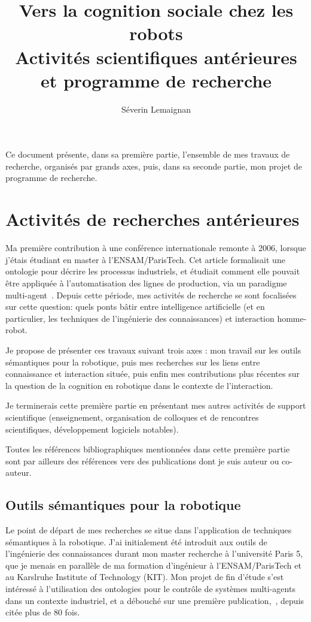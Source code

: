 \documentclass[a4paper]{article}
\title{Vers la cognition sociale chez les robots \\ 
    {\large Activités scientifiques antérieures et programme de recherche}}
\author{Séverin Lemaignan}
\date{}
\begin{document}
\maketitle

Ce document présente, dans sa première partie, l'ensemble de mes travaux de
recherche, organisés par grands axes, puis, dans sa seconde partie, mon projet
de programme de recherche.

\section{Activités de recherches antérieures}
\newrefsection

Ma première contribution à une conférence internationale remonte à 2006, lorsque
j'étais étudiant en master à l'ENSAM/ParisTech. Cet article formalisait une
ontologie pour décrire les processus industriels, et étudiait comment elle
pouvait être appliquée à l'automatisation des lignes de production, via un
paradigme multi-agent~\cite{lemaignan2006mason}. Depuis cette période, mes
activités de recherche se sont focalisées sur cette question: quels ponts bâtir
entre intelligence artificielle (et en particulier, les techniques de
l'ingénierie des connaissances) et interaction homme-robot.

Je propose de présenter ces travaux suivant trois axes : mon travail sur les
outils sémantiques pour la robotique, puis mes recherches sur les liens entre
connaissance et interaction située, puis enfin mes contributions plus récentes
sur la question de la cognition en robotique dans le contexte de l'interaction.

Je terminerais cette première partie en présentant mes autres activités de
support scientifique (enseignement, organisation de colloques et de rencontres
scientifiques, développement logiciels notables).

Toutes les références bibliographiques mentionnées dans cette première partie
sont par ailleurs des références vers des publications dont je suis auteur ou
co-auteur.

\subsection{Outils sémantiques pour la robotique%
  \label{semantic-tools-for-robotics}%
}

Le point de départ de mes recherches se situe dans l'application de techniques
sémantiques à la robotique. J'ai initialement été introduit aux outils de
l'ingénierie des connaissances durant mon master recherche à l'université Paris
5, que je menais en parallèle de ma formation d'ingénieur à l'ENSAM/ParisTech et
au Karslruhe Institute of Technology (KIT). Mon projet de fin d'étude s'est
intéressé à l'utilisation des ontologies pour le contrôle de systèmes
multi-agents dans un contexte industriel, et a débouché sur une première
publication,~\cite{lemaignan2006mason}, depuis citée plus de 80 fois.
\end{document}
